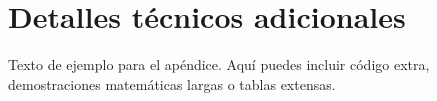 \section{Detalles técnicos adicionales}
Texto de ejemplo para el apéndice. Aquí puedes incluir código extra, demostraciones matemáticas largas o tablas extensas.